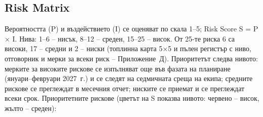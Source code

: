\documentclass[11pt,a4paper]{article}
\begin{document}
\subsection{Risk Matrix}

Вероятността (P) и въздействието (I) се оценяват по скала 1–5; Risk Score S = P × I. Нива: 1–6 – нисък, 8–12 – среден, 15–25 – висок. От 25-те риска 6 са високи, 17 – средни и 2 – ниски (топлинна карта 5×5 и пълен регистър с ниво, отговорник и мерки за всеки риск – Приложение~Д). Приоритетът следва нивото: мерките за високите рискове се изпълняват още във фазата на планиране (януари–февруари 2027~г.) и се следят на седмичната среща на екипа; средните рискове се преглеждат в месечния отчет; ниските се приемат и се преглеждат всеки срок. Приоритетните рискове (цветът на S показва нивото: червено – висок, жълто – среден):
\end{document}
